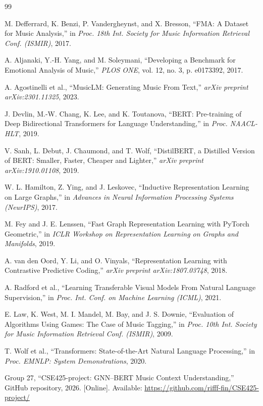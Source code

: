 \documentclass[10pt,twocolumn]{article}
\begin{document}
\begin{thebibliography}{99}
\small

M. Defferrard, K. Benzi, P. Vandergheynst, and X. Bresson, ``FMA: A Dataset for Music Analysis,'' in \textit{Proc. 18th Int. Society for Music Information Retrieval Conf. (ISMIR)}, 2017.

A. Aljanaki, Y.-H. Yang, and M. Soleymani, ``Developing a Benchmark for Emotional Analysis of Music,'' \textit{PLOS ONE}, vol. 12, no. 3, p. e0173392, 2017.

A. Agostinelli et al., ``MusicLM: Generating Music From Text,'' \textit{arXiv preprint arXiv:2301.11325}, 2023.

J. Devlin, M.-W. Chang, K. Lee, and K. Toutanova, ``BERT: Pre-training of Deep Bidirectional Transformers for Language Understanding,'' in \textit{Proc. NAACL-HLT}, 2019.

V. Sanh, L. Debut, J. Chaumond, and T. Wolf, ``DistilBERT, a Distilled Version of BERT: Smaller, Faster, Cheaper and Lighter,'' \textit{arXiv preprint arXiv:1910.01108}, 2019.

W. L. Hamilton, Z. Ying, and J. Leskovec, ``Inductive Representation Learning on Large Graphs,'' in \textit{Advances in Neural Information Processing Systems (NeurIPS)}, 2017.

M. Fey and J. E. Lenssen, ``Fast Graph Representation Learning with PyTorch Geometric,'' in \textit{ICLR Workshop on Representation Learning on Graphs and Manifolds}, 2019.

A. van den Oord, Y. Li, and O. Vinyals, ``Representation Learning with Contrastive Predictive Coding,'' \textit{arXiv preprint arXiv:1807.03748}, 2018.

A. Radford et al., ``Learning Transferable Visual Models From Natural Language Supervision,'' in \textit{Proc. Int. Conf. on Machine Learning (ICML)}, 2021.

E. Law, K. West, M. I. Mandel, M. Bay, and J. S. Downie, ``Evaluation of Algorithms Using Games: The Case of Music Tagging,'' in \textit{Proc. 10th Int. Society for Music Information Retrieval Conf. (ISMIR)}, 2009.

T. Wolf et al., ``Transformers: State-of-the-Art Natural Language Processing,'' in \textit{Proc. EMNLP: System Demonstrations}, 2020.

Group 27, ``CSE425-project: GNN--BERT Music Context Understanding,'' GitHub repository, 2026. [Online]. Available: \url{https://github.com/rifff-fin/CSE425-project/}

\end{thebibliography}
\end{document}
